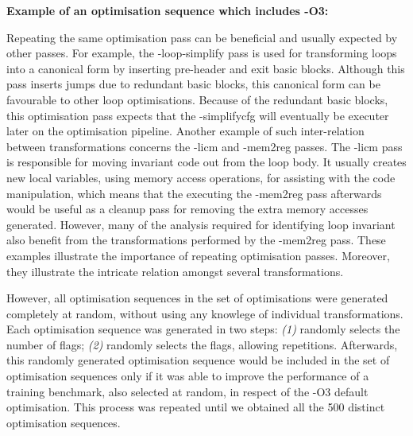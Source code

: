   \begin{minipage}{0.9\textwidth}
     \vspace{1em}
     \singlespace
     \noindent\textbf{Example of an optimisation sequence which includes {-O3}:}\vspace{-1ex}
     \vspace{2em}
  \end{minipage}

Repeating the same optimisation pass can be beneficial and usually expected by other passes.
For example, the {\flagstype -loop-simplify} pass is used for transforming loops into a canonical form by inserting pre-header and exit basic blocks.
Although this pass inserts jumps due to redundant basic blocks, this canonical form can be favourable to other loop optimisations.
Because of the redundant basic blocks, this optimisation pass expects that the {\flagstype -simplifycfg} will eventually be executer later on the optimisation pipeline.
Another example of such inter-relation between transformations concerns the {\flagstype -licm} and {\flagstype -mem2reg} passes.
The {\flagstype -licm} pass is responsible for moving invariant code out from the loop body. 
It usually creates new local variables, using memory access operations, for assisting with the code manipulation, which means that the executing the {\flagstype -mem2reg} pass afterwards would be useful as a cleanup pass for removing the extra memory accesses generated.
However, many of the analysis required for identifying loop invariant also benefit from the transformations performed by the {\flagstype -mem2reg} pass.
These examples illustrate the importance of repeating optimisation passes.
Moreover, they illustrate the intricate relation amongst several transformations. 

However, all optimisation sequences in the set of optimisations were generated completely at random, without using any knowlege of individual transformations.
Each optimisation sequence was generated in two steps: \textit{(1)} randomly selects the number of flags; \textit{(2)} randomly selects the flags, allowing repetitions.
Afterwards, this randomly generated optimisation sequence would be included in the set of optimisation sequences only if it was able to improve the performance of a training benchmark, also selected at random, in respect of the {\flagstype -O3} default optimisation.
This process was repeated until we obtained all the 500 distinct optimisation sequences.

